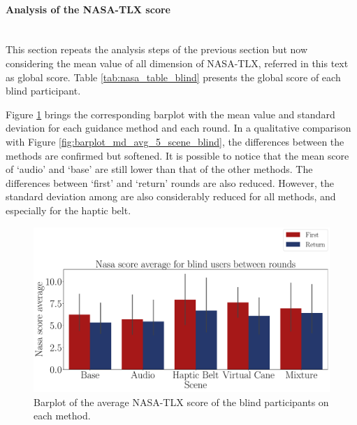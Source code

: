 

\FloatBarrier



\paragraph{Analysis of the NASA-TLX score}\mbox{}\\

This section repeats the analysis steps of the previous section but now considering the mean value of all dimension of NASA-TLX, referred in this text as global score. Table \ref{tab:nasa_table_blind} presents the global score of each blind participant. 



Figure \ref{fig:barplot_nasa_avg_5_scene_blind} brings the corresponding barplot with the mean value and standard deviation for each guidance method and each round. In a qualitative comparison with Figure \ref{fig:barplot_md_avg_5_scene_blind}, the differences between the methods are confirmed but softened. It is possible to notice that the mean score of ‘audio’ and ‘base’ are still lower than that of the other methods. The differences between ‘first’ and ‘return’ rounds are also reduced. However, the standard deviation among are also considerably reduced for all methods, and especially for the haptic belt.

\begin{figure}[!htb]
    \centering
    \includegraphics[width = 0.8\linewidth]{Resultados/Nasa/Figuras/pdf/barplot_nasa_avg_5_scene_blind.pdf}
    \caption{Barplot of the average NASA-TLX score of the blind participants on each method.}
    \label{fig:barplot_nasa_avg_5_scene_blind}
\end{figure}

